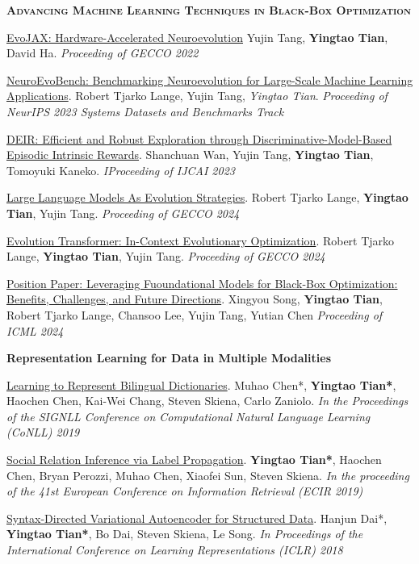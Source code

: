 \documentclass[line,margin]{cv}
\begin{document}
\begin{resume}
  \textbf{\textsc{Advancing Machine Learning Techniques in Black-Box Optimization}}

  \href{https://arxiv.org/abs/2202.05008}{EvoJAX: Hardware-Accelerated Neuroevolution}
  Yujin Tang, \textbf{Yingtao Tian}, David Ha.   \emph{Proceeding of GECCO 2022}

  \href{https://openreview.net/forum?id=s6qtLyR6uJ}{NeuroEvoBench: Benchmarking Neuroevolution for Large-Scale Machine Learning Applications}.
  Robert Tjarko Lange, Yujin Tang, \emph{Yingtao Tian}. \emph{Proceeding of NeurIPS 2023 Systems Datasets and Benchmarks Track}

  \href{https://arxiv.org/abs/2304.10770}{DEIR: Efficient and Robust Exploration through Discriminative-Model-Based Episodic Intrinsic Rewards}.
  Shanchuan Wan, Yujin Tang, \textbf{Yingtao Tian}, Tomoyuki Kaneko. \emph{IProceeding of IJCAI 2023}

  \href{https://arxiv.org/abs/2402.18381}{Large Language Models As Evolution Strategies}.
  Robert Tjarko Lange, \textbf{Yingtao Tian}, Yujin Tang. \emph{Proceeding of GECCO 2024}

  \href{https://arxiv.org/abs/2403.02985}{Evolution Transformer: In-Context Evolutionary Optimization}.
  Robert Tjarko Lange, \textbf{Yingtao Tian}, Yujin Tang. \emph{Proceeding of GECCO 2024}

  \href{https://arxiv.org/abs/2403.02985}{Position Paper: Leveraging Fuoundational Models for Black-Box Optimization: Benefits, Challenges, and Future Directions}.
  Xingyou Song, \textbf{Yingtao Tian}, Robert Tjarko Lange, Chansoo Lee, Yujin Tang, Yutian Chen \emph{Proceeding of ICML 2024}


  \textbf{Representation Learning for Data in Multiple Modalities}

  \href{https://arxiv.org/abs/1808.03726}{Learning to Represent Bilingual Dictionaries}.
  Muhao Chen*, \textbf{Yingtao Tian*}, Haochen Chen, Kai-Wei Chang, Steven Skiena, Carlo Zaniolo. \emph{In the Proceedings of the SIGNLL Conference on Computational Natural Language Learning (CoNLL) 2019}

  \href{http://www.mlgworkshop.org/2018/papers/MLG2018_paper_58.pdf}{Social Relation Inference via Label Propagation}.
  \textbf{Yingtao Tian*}, Haochen Chen, Bryan Perozzi, Muhao Chen, Xiaofei Sun, Steven Skiena. \emph{In the proceeding of the 41st European Conference on Information Retrieval (ECIR 2019)}

  \href{http://www.mlgworkshop.org/2018/papers/MLG2018_paper_58.pdf}{Syntax-Directed Variational Autoencoder for Structured Data}.
  Hanjun Dai*, \textbf{Yingtao Tian*}, Bo Dai, Steven Skiena, Le Song. \emph{In Proceedings of the International Conference on Learning Representations (ICLR) 2018}




\end{resume}
\end{document}
